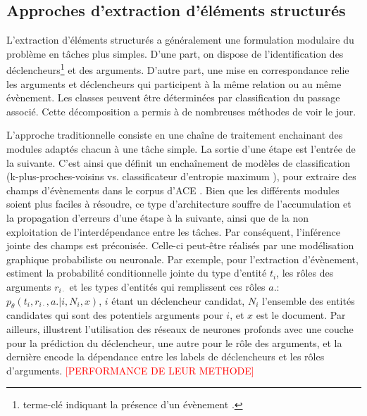\subsection{Approches d'extraction d'éléments structurés}
\label{quanta:related-approaches}
L'extraction d'éléments structurés a généralement une formulation modulaire du problème en tâches plus simples. D'une part, on dispose de l'identification des déclencheurs\footnote{terme-clé indiquant la présence d'un évènement \citep{ace2005event}.} et des arguments. D'autre part, une mise en correspondance relie les arguments et déclencheurs qui participent à la même relation ou au même évènement. Les classes peuvent être déterminées par classification du passage associé. Cette décomposition a permis à de nombreuses méthodes de voir le jour. 

L'approche traditionnelle consiste en une chaîne de traitement enchainant des modules adaptés chacun à une tâche simple. La sortie d'une étape est l'entrée de la suivante. C'est ainsi que \citet{ahn2006stages} définit un enchaînement de modèles de classification (k-plus-proches-voisins \citep{cover1967knn} vs. classificateur d'entropie maximum \citep{nigam1999maxent}), pour extraire des champs d'évènements dans le corpus d'ACE \citep{ace2005event}. Bien que les différents modules soient plus faciles à résoudre, ce type d'architecture souffre de l'accumulation et la propagation d'erreurs d'une étape à la suivante, ainsi que de la non exploitation de l'interdépendance entre les tâches. Par conséquent, l'inférence jointe des champs est préconisée. Celle-ci peut-être réalisés par une modélisation graphique probabiliste ou neuronale. Par exemple, pour l'extraction d'évènement, \citet{yang2016jointEntityEvt} estiment la probabilité conditionnelle jointe du type d'entité $t_i$, les rôles des arguments $r_{i\cdot}$ et les types d'entités qui remplissent ces rôles $a.$: $p_\theta(t_i,r_{i\cdot},a. \vert i, N_i, x)$, $i$ étant un déclencheur candidat, $N_i$ l'ensemble des entités candidates qui sont des potentiels arguments pour $i$, et $x$ est le document. Par ailleurs, \citet{nguyen2016jointtrgarg} illustrent l'utilisation des réseaux de neurones profonds avec une couche pour la prédiction du déclencheur, une autre pour le rôle des arguments, et la dernière encode la dépendance entre les labels de déclencheurs et les rôles d'arguments. \textcolor{red}{[PERFORMANCE DE LEUR METHODE]} 


